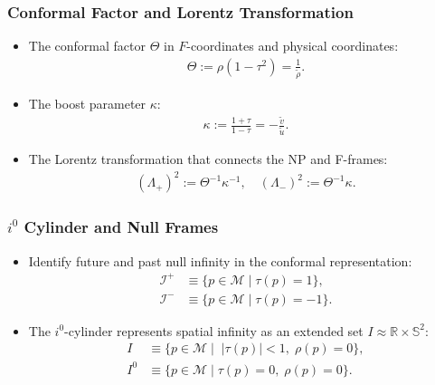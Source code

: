 \documentclass{beamer}
\theoremstyle{remark}
\theoremstyle{plain}
\theoremstyle{plain}
\begin{document}
\begin{frame}
  \frametitle{Conformal Factor and Lorentz Transformation}
  \begin{itemize}
    \item The conformal factor $\Theta$ in $F$-coordinates and physical coordinates:
    \begin{align}
      \Theta := \rho (1-\tau^2) = \frac{1}{\tilde{\rho}}.
    \end{align}
    \item The boost parameter $\kappa$:
    \begin{align}
      \kappa := \frac{1+\tau}{1-\tau} = -\frac{\tilde{v}}{\tilde{u}}.
    \end{align}
    \item The Lorentz transformation that connects the NP and F-frames:
    \begin{align}
      (\Lambda_{+})^{2} := \Theta^{-1}\kappa^{-1}, \quad (\Lambda_{-})^{2} := \Theta^{-1}\kappa.
    \end{align}
  \end{itemize}
\end{frame}

\begin{frame}
  \frametitle{$i^0$ Cylinder and Null Frames}
  \begin{itemize}
    \item Identify future and past null infinity in the conformal representation:
    \begin{align*}
      \mathscr{I}^{+} & \equiv \{ p \in \mathcal{M} \; \rvert\; \tau(p) =1\}, \\
      \mathscr{I}^{-} & \equiv \{ p \in \mathcal{M} \; \rvert \;\tau(p) =-1\}.
    \end{align*}
    \item The $i^0$-cylinder represents spatial infinity as an extended set $I \approx \mathbb{R}\times \mathbb{S}^2$:
    \begin{align*}
      I & \equiv \{ p \in \mathcal{M} \; \rvert \;\; |\tau(p)| < 1, \;\rho(p)=0\}, \\
      I^{0} & \equiv \{ p \in \mathcal{M}\; \rvert \;\tau(p)=0, \; \rho(p)=0\}.
    \end{align*}
  \end{itemize}
\end{frame}
\end{document}
